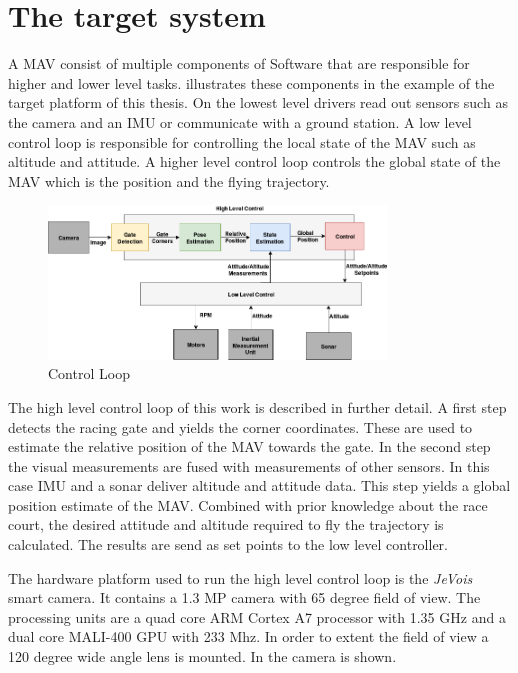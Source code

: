 \section{The target system}

A \ac{MAV} consist of multiple components of Software that are responsible for higher and lower level tasks.  illustrates these components in the example of the target platform of this thesis. On the lowest level drivers read out sensors such as the camera and an \ac{IMU} or communicate with a ground station. A low level control loop is responsible for controlling the local state of the \ac{MAV} such as altitude and attitude. A higher level control loop controls the global state of the \ac{MAV} which is the position and the flying trajectory.


\begin{figure}[hbtp]
	\centering
	\includegraphics[width=0.8\textwidth]{fig/control_loop}
	\caption{Control Loop}
	\label{fig:control_loop}
\end{figure}

The high level control loop of this work is described in further detail. A first step detects the racing gate and yields the corner coordinates. These are used to estimate the relative position of the \ac{MAV} towards the gate. In the second step the visual measurements are fused with measurements of other sensors. In this case \ac{IMU} and a sonar deliver altitude and attitude data. This step yields a global position estimate of the \ac{MAV}. Combined with prior knowledge about the race court, the desired attitude and altitude required to fly the trajectory is calculated. The results are send as set points to the low level controller.

The hardware platform used to run the high level control loop is the \textit{JeVois} smart camera. It contains a 1.3 MP camera with 65 degree field of view. The processing units are a quad core ARM Cortex A7 processor with 1.35 GHz and a dual core MALI-400 GPU with 233 Mhz. In order to extent the field of view a 120 degree wide angle lens is mounted. In  the camera is shown.

